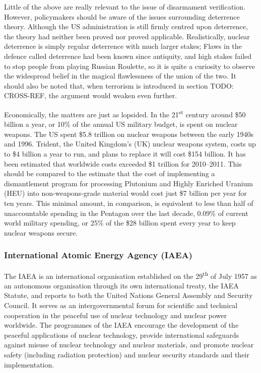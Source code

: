 \documentclass[twoside,titlepage,11pt,twocolumn,a4paper]{article}
\begin{document}
Little of the above are really relevant to the issue of disarmament
verification. However, policymakers should be aware of the issues
surrounding deterrence theory. Although the US administration is still
firmly centred upon deterrence, the theory had neither been proved nor
proved applicable. \citep{zeroNuke2011Economist,
  deterrenceFail2008Guardian, deterrenceFail2011NAPF} Realistically,
nuclear deterrence is simply regular deterrence with much larger
stakes; Flaws in the defence called deterrence had been known since
antiquity, and high stakes failed to stop people from playing Russian
Roulette, so it is quite a curiosity to observe the widespread belief
in the magical flawlessness of the union of the two.  It should also
be noted that, when terrorism is introduced in section TODO:
CROSS-REF, the argument would weaken even further.

Economically, the matters are just as lopsided. In the
21\textsuperscript{st} century around \$50 billion a year, or 10\%
of the annual US military budget, is spent on nuclear
weapons. \citep{USspending} The US spent \$5.8 trillion on nuclear
weapons between the early 1940s and 1996. Trident, the United
Kingdom's (UK) nuclear weapons system, costs up to \$4 billion a
year to run, and plans to replace it will cost \$154 billion. It has
been estimated that worldwide costs exceeded \$1 trillion for
2010--2011. \citep{worldSpending} This should be compared to the
estimate that the cost of implementing a dismantlement program for
processing Plutonium and Highly Enriched Uranium (HEU) into
non-weapons-grade material would cost just \$7 billion per year for
ten years. \citep{worldSafe} This minimal amount, in comparison, is
equivalent to less than half of unaccountable spending in the Pentagon
over the last decade, 0.09\% of current world military spending, or
25\% of the \$28 billion spent every year to keep nuclear weapons
secure.

\subsubsection{International Atomic Energy Agency (IAEA)}
The IAEA is an international organisation established on the
29\textsuperscript{th} of July 1957 as an autonomous organisation
through its own international treaty, the IAEA Statute, and reports to
both the United Nations General Assembly and Security Council. It
serves as an intergovernmental forum for scientific and technical
cooperation in the peaceful use of nuclear technology and nuclear
power worldwide. The programmes of the IAEA encourage the development
of the peaceful applications of nuclear technology, provide
international safeguards against misuse of nuclear technology and
nuclear materials, and promote nuclear safety (including radiation
protection) and nuclear security standards and their implementation.
\end{document}
